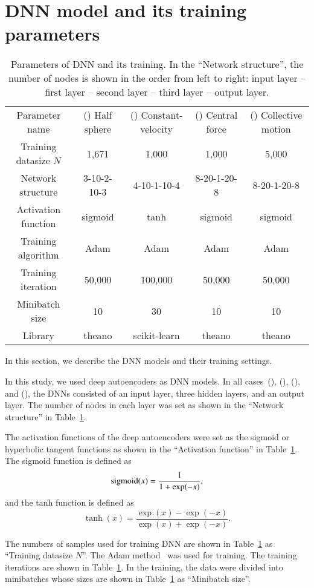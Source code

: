 \documentclass[preprint,
bibnotes,
 amsmath,amssymb,
 aps,
]{revtex4-1}
\newcounter{num}
\newcommand{\rnum}[1]{\setcounter{num}{#1}\roman{num}}
\begin{document}
\section{DNN model and its training parameters}
\label{dnn_params}
\begin{table}[t]
\caption{Parameters of DNN and its training. In the ``Network structure'', the number of nodes is shown in the order from left to right: input layer -- first layer -- second layer -- third layer -- output layer.}
\label{tbl_dnnsettings}
\begin{ruledtabular}
\begin{tabular}{c|cccc}
\textrm{Parameter name}&
\textrm{(\rnum{1}) Half sphere}&
\textrm{(\rnum{2}) Constant-velocity}&
\textrm{(\rnum{3}) Central force}&
\textrm{(\rnum{4}) Collective motion}\\
\colrule
Training datasize $N$ & 1,671 & 1,000 & 1,000 & 5,000\\
Network structure & 3-10-2-10-3 & 4-10-1-10-4 & 8-20-1-20-8 & 8-20-1-20-8\\
Activation function & sigmoid & tanh & sigmoid & sigmoid\\
Training algorithm & Adam & Adam & Adam & Adam\\
Training iteration & 50,000 & 100,000 & 50,000 & 50,000\\
Minibatch size & 10 & 30 & 10 & 10\\
Library & theano \cite{Bastien-Theano-2012, bergstra+al:2010-scipy} & scikit-learn \cite{scikit-learn} & theano & theano\\
\end{tabular}
\end{ruledtabular}
\end{table}
In this section, we describe the DNN models and their training settings.\par
In this study, we used deep autoencoders as DNN models. 
In all cases~(\rnum{1}), (\rnum{2}), (\rnum{3}), and (\rnum{4}), the DNNs consisted of an input layer, three hidden layers, and an output layer. 
The number of nodes in each layer was set as shown in the ``Network structure'' in Table~\ref{tbl_dnnsettings}.\par
The activation functions of the deep autoencoders were set as the sigmoid or hyperbolic tangent functions as shown in the ``Activation function'' in Table~\ref{tbl_dnnsettings}. 
The sigmoid function is defined as
\begin{equation}
{\rm sigmoid}(x) = \frac{1}{1 + \exp(-x)},
\end{equation}
and the tanh function is defined as
\begin{equation}
\tanh(x) = \frac{\exp(x) - \exp(-x)}{\exp(x) + \exp(-x)}.
\end{equation}\par
The numbers of samples used for training DNN are shown in Table~\ref{tbl_dnnsettings} as ``Training datasize $N$''. 
The Adam method~\cite{kingma2014adam} was used for training. 
The training iterations are shown in Table~\ref{tbl_dnnsettings}. 
In the training, the data were divided into minibatches whose sizes are shown in Table~\ref{tbl_dnnsettings} as ``Minibatch size''.




\end{document}
